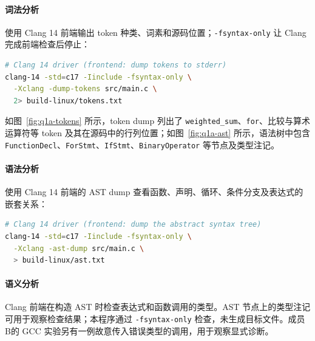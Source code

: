 \paragraph{词法分析}
使用 Clang 14 前端输出 token 种类、词素和源码位置；\texttt{-fsyntax-only} 让 Clang 完成前端检查后停止：
\begin{lstlisting}[language=bash]
# Clang 14 driver (frontend: dump tokens to stderr)
clang-14 -std=c17 -Iinclude -fsyntax-only \
  -Xclang -dump-tokens src/main.c \
  2> build-linux/tokens.txt
\end{lstlisting}
如图~\ref{fig:q1a-tokens} 所示，token dump 列出了 \texttt{weighted\_sum}、\texttt{for}、比较与算术运算符等 token 及其在源码中的行列位置；如图~\ref{fig:q1a-ast} 所示，语法树中包含 \texttt{FunctionDecl}、\texttt{ForStmt}、\texttt{IfStmt}、\texttt{BinaryOperator} 等节点及类型注记。

\paragraph{语法分析}
使用 Clang 14 前端的 AST dump 查看函数、声明、循环、条件分支及表达式的嵌套关系：
\begin{lstlisting}[language=bash]
# Clang 14 driver (frontend: dump the abstract syntax tree)
clang-14 -std=c17 -Iinclude -fsyntax-only \
  -Xclang -ast-dump src/main.c \
  > build-linux/ast.txt
\end{lstlisting}

\paragraph{语义分析}
Clang 前端在构造 AST 时检查表达式和函数调用的类型。AST 节点上的类型注记可用于观察检查结果；本程序通过 \texttt{-fsyntax-only} 检查，未生成目标文件。成员B的 GCC 实验另有一例故意传入错误类型的调用，用于观察显式诊断。

